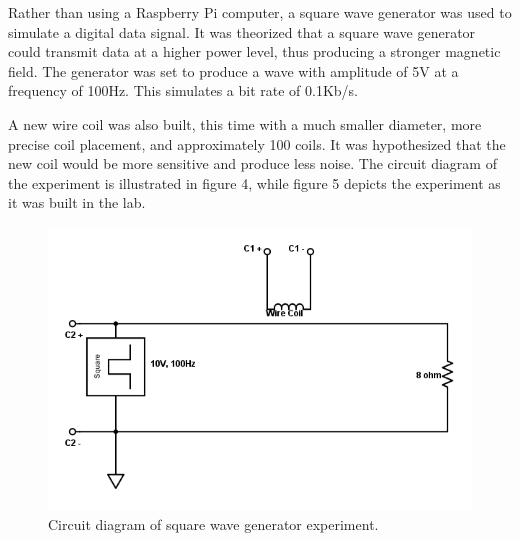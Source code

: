 \documentclass{article}
\begin{document}
Rather than using a Raspberry Pi computer, a square wave generator was used to simulate a digital data signal. It was theorized that a square wave generator could transmit data at a higher power level, thus producing a stronger magnetic field. The generator was set to produce a wave with amplitude of 5V at a frequency of 100Hz. This simulates a bit rate of 0.1Kb/s.

A new wire coil was also built, this time with a much smaller diameter, more precise coil placement, and approximately 100 coils. It was hypothesized that the new coil would be more sensitive and produce less noise. The circuit diagram of the experiment is illustrated in figure 4, while figure 5 depicts the experiment as it was built in the lab.

\begin{figure}
	\includegraphics[width=\linewidth]{images/circuit_diagram.png}
	\caption{Circuit diagram of square wave generator experiment.}
	\label{fig:square}
\end{figure}
\end{document}
